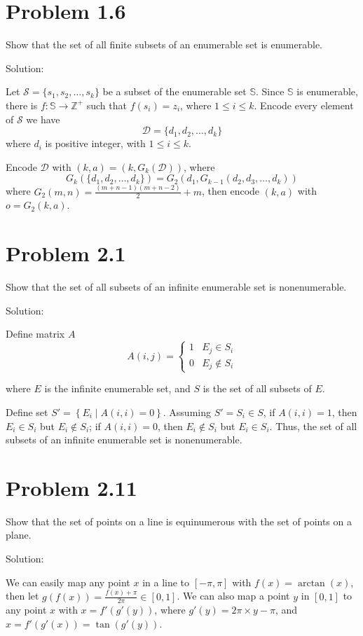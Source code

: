 \documentclass{ctexart}
\begin{document}
\section*{Problem 1.6}
Show that the set of all finite subsets of an enumerable set is enumerable.

Solution:

Let $\mathcal S = \{ s_1, s_2, \dots, s_k \}$ be a subset of the enumerable set $\mathbb S$. Since $\mathbb S$ is enumerable, there is $f: \mathbb S \to \mathbb Z^+$ such that $f(s_i) = z_i$, where $ 1 \le i \le k$. Encode every element of $\mathcal S$ we have
$$
\mathcal D = \{ d_1, d_2, \dots, d_k\}
$$
where $d_i$ is positive integer, with $1 \le i \le k$.

Encode $\mathcal D$ with $(k, a) = (k, G_k(\mathcal D))$, where
$$
G_k(\{ d_1, d_2, \dots, d_k\}) = G_2(d_1, G_{k-1}(d_2, d_3, \dots, d_k))
$$
where $G_2(m, n) = \frac{(m + n - 1)(m + n - 2)}{2} + m$, then encode $(k, a)$ with $o = G_2(k, a)$.

\section*{Problem 2.1}
Show that the set of all subsets of an infinite enumerable set is nonenumerable.

Solution:

Define matrix $A$
$$
A(i, j) = \begin{cases} 1 & E_j \in S_i \\ 0 & E_j \not\in S_i \end{cases}
$$

where $E$ is the infinite enumerable set, and $S$ is the set of all subsets of $E$.

Define set $S' = \left\{ E_i \mid A(i, i) = 0 \right\}$. Assuming $S' = S_i \in S$, if $A(i, i) = 1$, then $E_i \in S_i$ but $E_i \not\in S_i$; if $A(i, i) = 0$, then $E_i \not\in S_i$ but $E_i \in S_i$. Thus, the set of all subsets of an infinite enumerable set is nonenumerable.

\section*{Problem 2.11}
Show that the set of points on a line is equinumerous with the set of points on
a plane.

Solution:

We can easily map any point $x$ in a line to $[-\pi, \pi]$ with $f(x) = \arctan(x)$, then let $g(f(x)) = \frac{f(x) + \pi}{2\pi} \in [0, 1]$. We can also map a point $y$ in $[0, 1]$ to any point $x$ with $x = f'(g'(y))$, where $g'(y) = 2\pi \times y - \pi$, and $x = f'(g'(x)) = \tan(g'(y))$.
\end{document}

